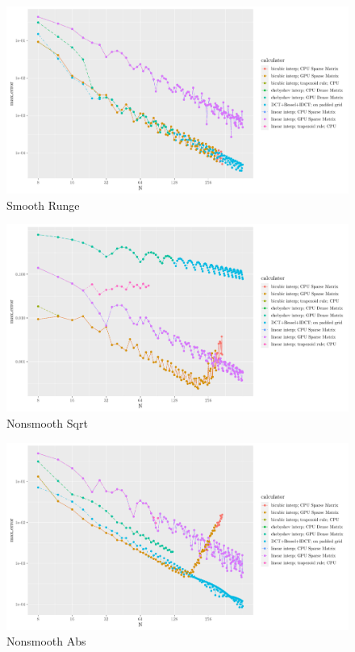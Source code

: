 \documentclass[
  letterpaper,
  landscape]{article}
\begin{document}
\begin{figure}

{\centering \includegraphics{myThesis_files/figure-latex/unnamed-chunk-5-1} 

}

\caption{Smooth Runge}\label{fig:unnamed-chunk-5}
\end{figure}

\begin{figure}

{\centering \includegraphics{myThesis_files/figure-latex/unnamed-chunk-6-1} 

}

\caption{Nonsmooth Sqrt}\label{fig:unnamed-chunk-6}
\end{figure}

\begin{figure}

{\centering \includegraphics{myThesis_files/figure-latex/unnamed-chunk-7-1} 

}

\caption{Nonsmooth Abs}\label{fig:unnamed-chunk-7}
\end{figure}
\end{document}
